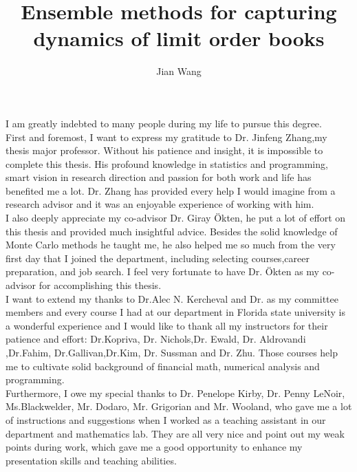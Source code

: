 \documentclass[11pt,expanded,copyright]{fsuthesis}
\title{Ensemble methods for capturing dynamics of limit order books}
\author{Jian Wang}
\begin{document}
\frontmatter
\maketitle
\makecommitteepage


\begin{acknowledgments}
I am greatly indebted to many people during my life to pursue this degree.\\

First and foremost, I want to express my gratitude to Dr. Jinfeng Zhang,my thesis major professor. Without his patience and insight, it is impossible to complete this thesis. His profound knowledge in statistics and programming, smart vision in research direction and passion for both work and life has benefited me a lot. Dr. Zhang has provided every help I would imagine from a research advisor and it was an enjoyable experience of working with him.\\

I also deeply appreciate my co-advisor Dr. Giray \"{O}kten, he put a lot of effort on this thesis and provided much insightful advice. Besides the solid knowledge of Monte Carlo methods he taught me, he also helped me so much from the very first day that I joined the department, including selecting courses,career preparation, and job search. I feel very fortunate to have Dr. \"{O}kten as my co-advisor for accomplishing this thesis.\\

I want to extend my thanks to Dr.Alec N. Kercheval and Dr. as my committee members and every course I had at our department in Florida state university is a wonderful experience and I would like to thank all my instructors for their patience and effort: Dr.Kopriva, Dr. Nichols,Dr. Ewald, Dr. Aldrovandi ,Dr.Fahim, Dr.Gallivan,Dr.Kim, Dr. Sussman and Dr. Zhu. Those courses help me to cultivate solid background of financial math, numerical analysis and programming.\\
  
Furthermore, I owe my special thanks to  Dr. Penelope Kirby, Dr. Penny LeNoir, Ms.Blackwelder, Mr. Dodaro, Mr. Grigorian and Mr. Wooland, who gave me a lot of instructions and suggestions when I worked as a teaching assistant in our department and mathematics lab. They are all very nice and point out my weak points during work, which gave me a good opportunity to enhance my presentation skills and teaching abilities.\\


\end{acknowledgments}
\end{document}
